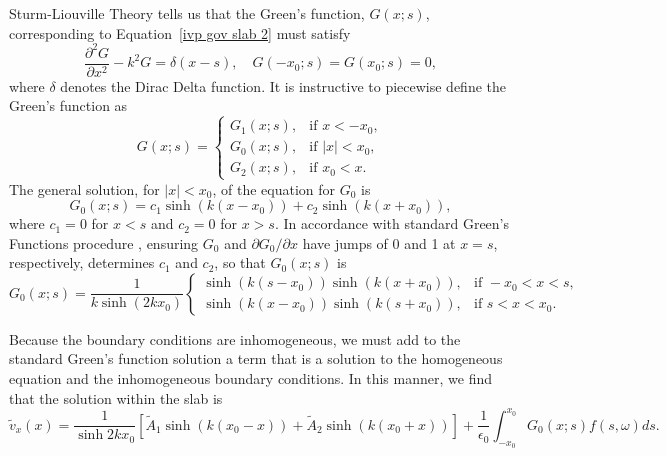 \documentclass{aastex61}
\begin{document}
Sturm-Liouville Theory tells us that the Green's function, $G(x;s)$, corresponding to Equation~\eqref{ivp gov slab 2} must satisfy 
\begin{equation}
\frac{\partial^2G}{\partial x^2} - k^2 G = \delta(x-s), \quad G(-x_0;s) = G(x_0;s) = 0,
\end{equation}
where $\delta$ denotes the Dirac Delta function. It is instructive to piecewise define the Green's function as
\begin{equation}
G(x;s) = 
\begin{cases}
G_1(x;s), & \text{if } x < -x_0, \\
G_0(x;s), & \text{if } |x| < x_0, \\
G_2(x;s), & \text{if } x_0 < x.
\end{cases}
\end{equation}
The general solution, for $|x| < x_0$, of the equation for $G_0$ is
\begin{equation}
G_0(x;s) = c_1\sinh(k(x - x_0)) + c_2\sinh(k(x + x_0)),
\end{equation}
where $c_1 = 0$ for $x < s$ and $c_2 = 0$ for $x > s$. In accordance with standard Green's Functions procedure \citep{boy_etal12}, ensuring $G_0$ and $\partial G_0 / \partial x$ have jumps of 0 and 1 at $x = s$, respectively,  determines $c_1$ and $c_2$, so that $G_0(x;s)$ is
\begin{equation}
G_0(x;s) = \frac{1}{k\sinh(2k x_0)}
\begin{cases}
\sinh(k(s - x_0))\sinh(k(x + x_0)), & \text{if } -x_0<x<s, \\
\sinh(k(x - x_0))\sinh(k(s + x_0)), & \text{if } s<x<x_0.
\end{cases}
\end{equation}

Because the boundary conditions are inhomogeneous, we must add to the standard Green's function solution a term that is a solution to the homogeneous equation and the inhomogeneous boundary conditions. In this manner, we find that the solution within the slab is
\begin{equation}
\tilde{v}_x(x) = \frac{1}{\sinh{2kx_0}} \left[ \tilde{A}_1\sinh(k(x_0 - x)) + \tilde{A}_2\sinh(k(x_0 + x)) \right] + \frac{1}{\epsilon_0}\int_{-x_0}^{x_0} G_0(x;s) f(s, \omega) ds.
\end{equation}
\end{document}
